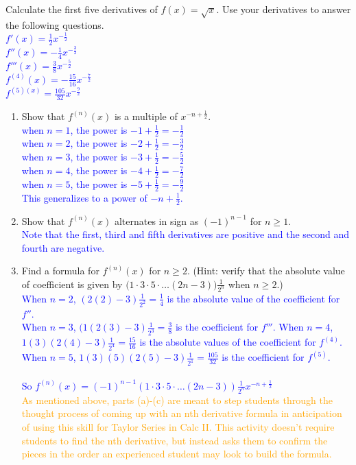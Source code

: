 \documentclass{ximera}
\begin{document}
\begin{exercise}
    Calculate the first five derivatives of $f(x)=\sqrt{x}$.  Use your derivatives to answer the following questions.\\
    \textcolor{blue}{$f'(x)=\frac{1}{2}x^{-\frac12}$\\
    $f''(x)=-\frac{1}{4}x^{-\frac{3}{2}}$\\
    $f'''(x)=\frac38x^{-\frac{5}{2}}$\\
    $f^{(4)}(x)=-\frac{15}{16}x^{-\frac{7}{2}}$\\
    $f^{(5)(x)}=\frac{105}{32}x^{-\frac{9}{2}}$}
        \begin{enumerate}
            \item Show that $f^{(n)}(x)$ is a multiple of $x^{-n+\frac12}$.\\
            \textcolor{blue}{ when $n=1$, the power is $-1+\frac12=-\frac12$\\
             when $n=2$, the power is $-2+\frac12=-\frac32$\\
            when $n=3$, the power is $-3+\frac12=-\frac52$\\
            when $n=4$, the power is $-4+\frac12=-\frac72$\\
            when $n=5$, the power is $-5+\frac12=-\frac92$\\
            This generalizes to a power of $-n+\frac12$.}
            \item Show that $f^{(n)}(x)$ alternates in sign as $(-1)^{n-1}$ for $n\geq 1$.\\
            \textcolor{blue}{ Note that the first, third and fifth derivatives are positive and the second and fourth are negative.}
            \item Find a formula for $f^{(n)}(x)$ for $n\geq 2$.  (Hint: verify that the absolute value of coefficient is given by $\big(1\cdot3\cdot5\cdot \dots(2n-3)\big)\frac{1}{2^n}$ when $n\geq 2$.)\\
            \textcolor{blue}{ 
            When $n=2$, $(2(2)-3)\frac{1}{2^2}=\frac{1}{4}$ is the absolute value of the coefficient for $f''$.\\
            When $n=3$, $(1(2(3)-3)\frac{1}{2^3}=\frac{3}{8}$ is the coefficient for $f'''$.
            When $n=4$, $1(3)(2(4)-3)\frac{1}{2^4}=\frac{15}{16}$ is the absolute values of the coefficient for $f^{(4)}$.\\
            When $n=5$, $1(3)(5)(2(5)-3)\frac{1}{2^1}=\frac{105}{32}$ is the coefficient for $f^{(5)}$.\\\\
            So $f^{(n)}(x)=(-1)^{n-1}(1\cdot3\cdot5\cdot\dots(2n-3))\frac{1}{2^n}x^{-n+\frac12}$}\\
            \textcolor{orange}{As mentioned above, parts (a)-(c) are meant to step students through the thought process of coming up with an nth derivative formula in anticipation of using this skill for Taylor Series in Calc II.  This activity doesn't require students to find the nth derivative, but instead asks them to confirm the pieces in the order an experienced student may look to build the formula.}
        \end{enumerate}
\end{exercise}
\end{document}
